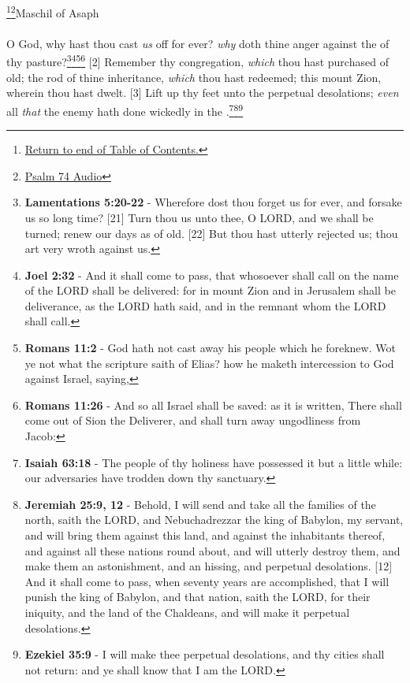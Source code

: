 \footnote{\textcolor[cmyk]{0.99998,1,0,0}{\hyperlink{TOC}{Return to end of Table of Contents.}}}\footnote{\href{https://audiobible.com/bible/psalms_74.html}{\textcolor[cmyk]{0.99998,1,0,0}{Psalm 74 Audio}}}\textcolor[cmyk]{0.99998,1,0,0}{Maschil of Asaph}\\
\\
\textcolor[cmyk]{0.99998,1,0,0}{O God, why hast thou cast \emph{us} off for ever? \emph{why} doth thine anger  against the  of thy pasture?}\footnote{\textbf{Lamentations 5:20-22} - Wherefore dost thou forget us for ever, and forsake us so long time? [21] Turn thou us unto thee, O LORD, and we shall be turned; renew our days as of old. [22] But thou hast utterly rejected us; thou art very wroth against us.}\footnote{\textbf{Joel 2:32} - And it shall come to pass, that whosoever shall call on the name of the LORD shall be delivered: for in mount Zion and in Jerusalem shall be deliverance, as the LORD hath said, and in the remnant whom the LORD shall call.}\footnote{\textbf{Romans 11:2} - God hath not cast away his people which he foreknew. Wot ye not what the scripture saith of Elias? how he maketh intercession to God against Israel, saying,}\footnote{\textbf{Romans 11:26} - And so all Israel shall be saved: as it is written, There shall come out of Sion the Deliverer, and shall turn away ungodliness from Jacob:}
[2] \textcolor[cmyk]{0.99998,1,0,0}{Remember thy congregation, \emph{which} thou hast purchased of old; the rod of thine inheritance, \emph{which} thou hast redeemed; this mount Zion, wherein thou hast dwelt.}
[3] \textcolor[cmyk]{0.99998,1,0,0}{Lift up thy feet unto the perpetual desolations; \emph{even} all \emph{that} the enemy hath done wickedly in the .}\footnote{\textbf{Isaiah 63:18} - The people of thy holiness have possessed it but a little while: our adversaries have trodden down thy sanctuary.}\footnote{\textbf{Jeremiah 25:9, 12} - Behold, I will send and take all the families of the north, saith the LORD, and Nebuchadrezzar the king of Babylon, my servant, and will bring them against this land, and against the inhabitants thereof, and against all these nations round about, and will utterly destroy them, and make them an astonishment, and an hissing, and perpetual desolations. [12] And it shall come to pass, when seventy years are accomplished, that I will punish the king of Babylon, and that nation, saith the LORD, for their iniquity, and the land of the Chaldeans, and will make it perpetual desolations.}\footnote{\textbf{Ezekiel 35:9} - I will make thee perpetual desolations, and thy cities shall not return: and ye shall know that I am the LORD.}
